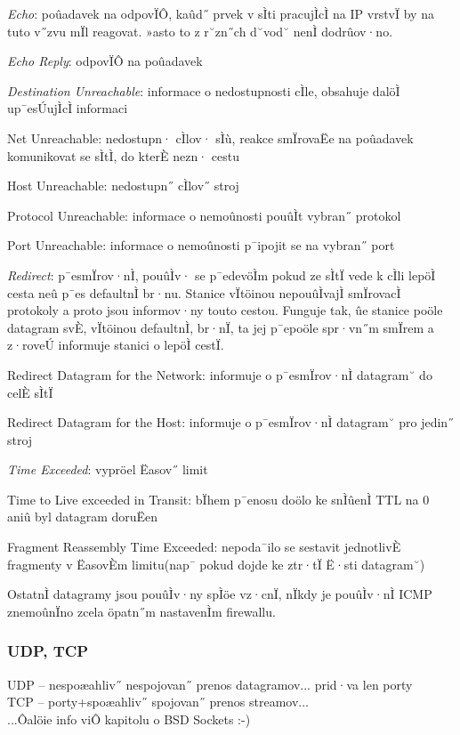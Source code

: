 \begin{pitemize}
    \item \emph{Echo}: poûadavek na odpovÏÔ, kaûd˝ prvek v sÌti pracujÌcÌ na IP vrstvÏ by na tuto v˝zvu mÏl reagovat. »asto to z r˘zn˝ch d˘vod˘ nenÌ dodrûov·no.
    \item \emph{Echo Reply}: odpovÏÔ na poûadavek
    \item \emph{Destination Unreachable}: informace o nedostupnosti cÌle, obsahuje dalöÌ up¯esÚujÌcÌ informaci
		\begin{pitemize}
			\item Net Unreachable: nedostupn· cÌlov· sÌù, reakce smÏrovaËe na poûadavek komunikovat se sÌtÌ, do kterÈ nezn· cestu
			\item Host Unreachable: nedostupn˝ cÌlov˝ stroj
			\item Protocol Unreachable: informace o nemoûnosti pouûÌt vybran˝ protokol
			\item Port Unreachable: informace o nemoûnosti p¯ipojit se na vybran˝ port
		\end{pitemize}
    \item \emph{Redirect}: p¯esmÏrov·nÌ, pouûÌv· se p¯edevöÌm pokud ze sÌtÏ vede k cÌli lepöÌ cesta neû p¯es defaultnÌ br·nu. Stanice vÏtöinou nepouûÌvajÌ smÏrovacÌ protokoly a proto jsou informov·ny touto cestou. Funguje tak, ûe stanice poöle datagram svÈ, vÏtöinou defaultnÌ, br·nÏ, ta jej p¯epoöle spr·vn˝m smÏrem a z·roveÚ informuje stanici o lepöÌ cestÏ.
		\begin{pitemize}
			\item Redirect Datagram for the Network: informuje o p¯esmÏrov·nÌ datagram˘ do celÈ sÌtÏ
			\item Redirect Datagram for the Host: informuje o p¯esmÏrov·nÌ datagram˘ pro jedin˝ stroj
		\end{pitemize}
    \item \emph{Time Exceeded}: vypröel Ëasov˝ limit
		\begin{pitemize}
			\item Time to Live exceeded in Transit: bÏhem p¯enosu doölo ke snÌûenÌ TTL na 0 aniû byl datagram doruËen
			\item Fragment Reassembly Time Exceeded: nepoda¯ilo se sestavit jednotlivÈ fragmenty v ËasovÈm limitu(nap¯ pokud dojde ke ztr·tÏ Ë·sti datagram˘)
		\end{pitemize}
\end{pitemize}

OstatnÌ datagramy jsou pouûÌv·ny spÌöe vz·cnÏ, nÏkdy je pouûÌv·nÌ ICMP znemoûnÏno zcela öpatn˝m nastavenÌm firewallu.

\subsubsection*{UDP, TCP}
UDP -- nespoæahliv˝ nespojovan˝ prenos datagramov... prid·va len porty\\
TCP -- porty+spoæahliv˝ spojovan˝ prenos streamov... \\
...Ôalöie info viÔ kapitolu o BSD Sockets :-) \\